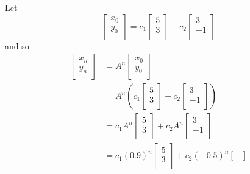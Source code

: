 \documentclass{article}
\begin{document}
\begin{example}
  Let \[
    \begin{bmatrix}
      x_0 \\y_0\\
    \end{bmatrix} = c_1
    \begin{bmatrix}
      5 \\3\\
    \end{bmatrix} + c_2
    \begin{bmatrix}
      3 \\-1\\
    \end{bmatrix}
  \] and so
  \begin{align*}
    \begin{bmatrix}
      x_n \\y_n\\
    \end{bmatrix} & = A^n
    \begin{bmatrix}
      x_0 \\y_0\\
    \end{bmatrix}                   \\
                    & = A^n\left(c_1
    \begin{bmatrix}
      5 \\3\\
    \end{bmatrix} + c_2
    \begin{bmatrix}
      3 \\-1\\
    \end{bmatrix}\right)             \\
                    & = c_1A^n
    \begin{bmatrix}
      5 \\3\\
    \end{bmatrix} + c_2A^n
    \begin{bmatrix}
      3 \\-1\\
    \end{bmatrix}                   \\
                    & = c_1(0.9)^n
    \begin{bmatrix}
      5 \\3\\
    \end{bmatrix} + c_2(-0.5)^n
    \begin{bmatrix}

\end{bmatrix}
\end{align*}
\end{example}
\end{document}
